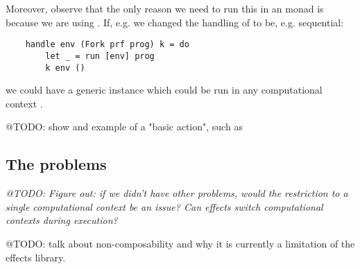Moreover, observe that the only reason we need to run this in an 
monad is because we are using . If, e.g. we changed the handling of
 to be, e.g. sequential:

\begin{verbatim}
    handle env (Fork prf prog) k = do
        let _ = run [env] prog
        k env ()
\end{verbatim}

we could have a generic instance which could be run in any computational
context .

@TODO: show and example of a "basic action", such as 

\subsection{The problems}

\emph{@TODO: Figure out: if we didn't have other problems, would the
restriction to a single computational context be an issue? Can effects switch
computational contexts during execution?}

@TODO: talk about non-composability and why it is currently a limitation of the
effects library.
